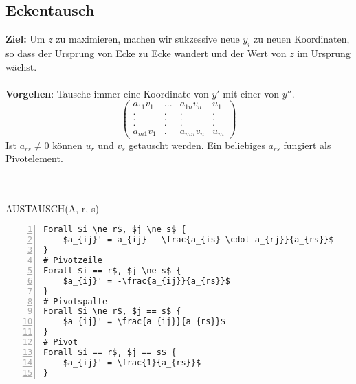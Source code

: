 \subsection{Eckentausch}
\textbf{Ziel:} Um \(z\) zu maximieren, machen wir sukzessive neue \(y_i\) zu neuen Koordinaten, so dass der Ursprung von Ecke zu Ecke wandert und der Wert von \(z\) im Ursprung wächst.
\\\\
\textbf{Vorgehen}: Tausche immer eine Koordinate von \(y'\) mit einer von \(y''\).
\[\begin{pmatrix}
	a_{11}v_1 & ... &a_{1n}v_n & u_1\\
	.   &		.	& .   & . \\
	.   &		.	& .   & . \\
	.   &		.	& .   & . \\
	a_{m1}v_1 & . & a_{mn}v_n & u_m
\end{pmatrix}\]
Ist \(a_{rs} \ne 0\) können \(u_r\) und \(v_s\) getauscht werden. Ein beliebiges \(a_{rs}\) fungiert als Pivotelement. 
\\\\\\
\begin{minipage}{\textwidth}
AUSTAUSCH(A, r, s)
\begin{lstlisting}[frame=single,numbers=left,mathescape]
Forall $i \ne r$, $j \ne s$ {
	$a_{ij}' = a_{ij} - \frac{a_{is} \cdot a_{rj}}{a_{rs}}$
}
# Pivotzeile
Forall $i == r$, $j \ne s$ {
	$a_{ij}' = -\frac{a_{ij}}{a_{rs}}$
}
# Pivotspalte
Forall $i \ne r$, $j == s$ {
	$a_{ij}' = \frac{a_{ij}}{a_{rs}}$
}
# Pivot
Forall $i == r$, $j == s$ {
	$a_{ij}' = \frac{1}{a_{rs}}$
}
\end{lstlisting}
\end{minipage}


